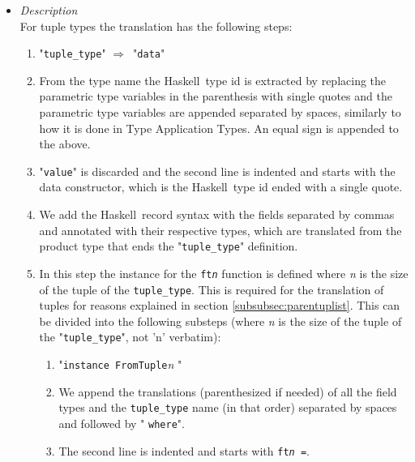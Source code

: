 \documentclass[diploma]{softlab-thesis}
\def\H{Haskell}
\def\lra{$\Longrightarrow$\ }
\begin{document}
\begin{itemize}
\begin{verbatim}
c0root :: a1 -> A'Tree a1 -> A'Tree a1
c0subtrees :: A'Trees a1 -> A'Tree a1 -> A'Tree a1
c0root = \new x -> x { root = new }
c0subtrees = \new x -> x { subtrees = new }
\end{verbatim}
\item
\textit{Description}\\

For tuple types the translation has the following steps:

\begin{enumerate}

\item
"\verb|tuple_type|" \lra "\texttt{data}"

\item
From the type name the \H\ type id is extracted by replacing the parametric
type variables in the parenthesis with single quotes and the parametric type
variables are appended separated by spaces, similarly to how it is done in Type
Application Types. An equal sign is appended to the above.

\item
"\texttt{value}" is discarded and the second line is indented and starts
with the data constructor, which is the \H\ type id ended with a single quote.

\item
We add the \H\ record syntax with the fields separated by commas and annotated
with their respective types, which are translated from the product type that
ends the "\verb|tuple_type|" definition.

\item
In this step the instance for the \texttt{ft\textit{n}} function is defined
where \textit{n} is the size of the tuple of the \verb|tuple_type|. This is
required for the translation of tuples for reasons explained in section
\ref{subsubsec:parentuplist}. This can be divided into the following substeps
(where \textit{n} is the size of the tuple of the "\verb|tuple_type|", not
'n' verbatim):

\begin{enumerate}
\item
"\texttt{instance FromTuple}\textit{n} "

\item
We append the translations (parenthesized if needed) of all the field types and
the \verb|tuple_type| name (in that order) separated by spaces and followed
by " \texttt{where}".

\item
The second line is indented and starts with \texttt{ft\textit{n} =}.


\end{enumerate}
\end{enumerate}
\end{itemize}
\end{document}
